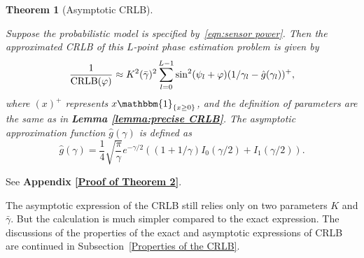\documentclass[journal,twocolumn]{IEEEtran}
\newtheorem{theorem}{\bf Theorem}
\theoremstyle{nonumberplain}
\begin{document}
    \begin{theorem}[Asymptotic CRLB] \label{thm:asymptotic CRLB} \mbox{}\par
        Suppose the probabilistic model is specified by~\eqref{eqn:sensor power}. Then the approximated CRLB of this $L$-point phase estimation problem is given by 
        \begin{equation}
            \frac{1}{{\rm CRLB}(\varphi)}\approx K^2(\bar{\gamma})^2 \sum_{l=0}^{L-1}\sin^2(\psi_l+\varphi)(1/\gamma_l-\hat{g}(\gamma_l))^{+},
            \label{eqn:asymptotic CRLB}
        \end{equation}
        where $(x)^{+}$ represents ${x{\mathbbm{1}}_{\{x\geq 0\}}}$, and the definition of parameters are the same as in {\bf Lemma \ref{lemma:precise CRLB}}. The asymptotic approximation function $\hat{g}(\gamma)$ is defined as 
        \begin{equation}
            \hat{g}(\gamma) = \frac{1}{4} \sqrt{\frac{\pi}{\gamma}}e^{-\gamma/2}\left((1+1/\gamma)I_0(\gamma/2) + I_1(\gamma/2)\right).
            \label{eqn:definition g function}
        \end{equation}
    \end{theorem}
    \begin{IEEEproof}
        See {\bf Appendix \ref{Proof of Theorem 2}}. 
    \end{IEEEproof}
    
        The asymptotic expression of the CRLB still relies only on two parameters $K$ and $\bar{\gamma}$. But the calculation is much simpler compared to the exact expression. 
        The discussions of the properties of the exact and asymptotic expressions of CRLB are continued in Subsection~\ref{Properties of the CRLB}.
        
\end{document}
